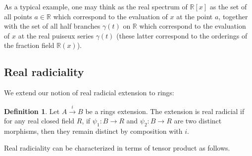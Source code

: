 \documentclass[12pt]{amsart}
\theoremstyle{definition}
\newtheorem{defn}[thm]{Definition}
\def \RR {{\mathbb R}}
\begin{document}
As a typical example, one may think as the real spectrum of $\RR[x]$ as the set of all points $a\in\RR$ which correspond to the evaluation of $x$ at the point $a$, together with the set of all half branches $\gamma(t)$ on $\RR$ which correspond to the evaluation of $x$ at the real puiseux series $\gamma(t)$ (these latter correspond to the orderings of the fraction field $\RR(x)$).


\subsection{Real radiciality}
We extend our notion of real radicial extension to rings:
\begin{defn}
Let $A\xrightarrow{i}  B$ be a rings extension. The extension is real radicial if for any real closed field $R$, if $\psi_1:B\to R$ and $\psi_2:B\to R$ are two distinct morphisms, then they remain distinct by composition with $i$.
\end{defn}

Real radiciality can be characterized in terms of tensor product as follows.
\end{document}
